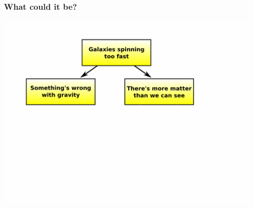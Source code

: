\documentclass[compress]{beamer}
\begin{document}
\begin{frame}
\frametitle{What could it be?}
\begin{center}
\includegraphics[width=\linewidth]{pictures/flow_chart_1.png}
\end{center}
\end{frame}
\end{document}

